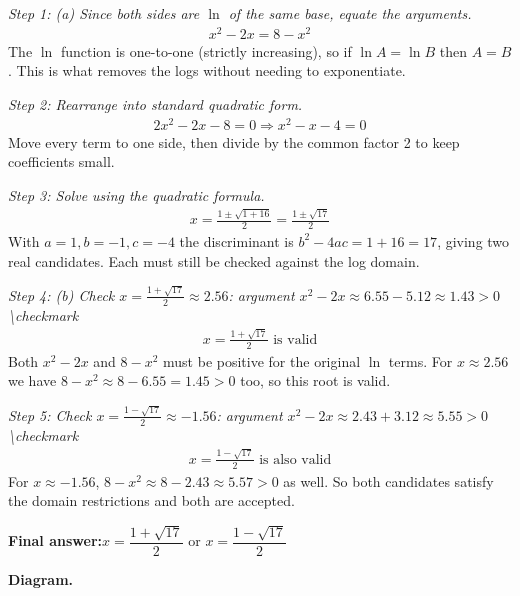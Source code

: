 \documentclass[11pt]{article}
\begin{document}
\textit{Step 1: (a) Since both sides are \( \ln \) of the same base, equate the arguments.}
\[\begin{gathered}
x^2 - 2x = 8 - x^2
\end{gathered}\]
The \( \ln \) function is one-to-one (strictly increasing), so if \( \ln A = \ln B \) then \( A = B \). This is what removes the logs without needing to exponentiate.

\textit{Step 2: Rearrange into standard quadratic form.}
\[\begin{gathered}
2x^2 - 2x - 8 = 0 \Rightarrow x^2 - x - 4 = 0
\end{gathered}\]
Move every term to one side, then divide by the common factor 2 to keep coefficients small.

\textit{Step 3: Solve using the quadratic formula.}
\[\begin{gathered}
x = \frac{1 \pm \sqrt{1 + 16}}{2} = \frac{1 \pm \sqrt{17}}{2}
\end{gathered}\]
With \( a=1, b=-1, c=-4 \) the discriminant is \( b^2 - 4ac = 1 + 16 = 17 \), giving two real candidates. Each must still be checked against the log domain.

\textit{Step 4: (b) Check \( x = \frac{1 + \sqrt{17}}{2} \approx 2.56 \): argument \( x^2 - 2x \approx 6.55 - 5.12 \approx 1.43 > 0 \) \textbackslash checkmark}
\[\begin{gathered}
x = \frac{1+\sqrt{17}}{2} \text{ is valid}
\end{gathered}\]
Both \( x^2 - 2x \) and \( 8 - x^2 \) must be positive for the original \( \ln \) terms. For \( x \approx 2.56 \) we have \( 8 - x^2 \approx 8 - 6.55 = 1.45 > 0 \) too, so this root is valid.

\textit{Step 5: Check \( x = \frac{1 - \sqrt{17}}{2} \approx -1.56 \): argument \( x^2 - 2x \approx 2.43 + 3.12 \approx 5.55 > 0 \) \textbackslash checkmark}
\[\begin{gathered}
x = \frac{1-\sqrt{17}}{2} \text{ is also valid}
\end{gathered}\]
For \( x \approx -1.56 \), \( 8 - x^2 \approx 8 - 2.43 \approx 5.57 > 0 \) as well. So both candidates satisfy the domain restrictions and both are accepted.

\begin{answerbox}
\textbf{Final answer:}\quad \(\displaystyle  x = \dfrac{1 + \sqrt{17}}{2} \) or \(\displaystyle  x = \dfrac{1 - \sqrt{17}}{2} \)
\end{answerbox}
\textbf{Diagram.}
\end{document}
